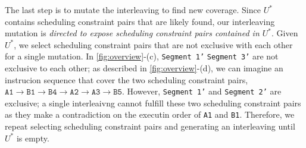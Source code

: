 The last step is to mutate the interleaving to find new
coverage. Since $U^*$ contains scheduling constraint pairs that are
likely found, our interleaving mutation is \textit{directed to expose
  scheduling constraint pairs contained in $U^*$}.
%
Given $U^*$, we select scheduling constraint pairs that are not
exclusive with each other for a single mutation.
%
In \autoref{fig:overview}-(c), \texttt{Segment 1'} \texttt{Segment 3'}
are not exclusive to each other; as described in
\autoref{fig:overview}-(d), we can imagine an instrucion sequence that
cover the two scheduling constraint pairs,
$\texttt{A1} \rightarrow \texttt{B1} \rightarrow \texttt{B4}
\rightarrow \texttt{A2} \rightarrow \texttt{A3} \rightarrow
\texttt{B5}$.
%
However, \texttt{Segment 1'} and \texttt{Segment 2'} are exclusive; a
single interleaivng cannot fulfill these two scheduling constraint
pairs as they make a contradiction on the executin order of
\texttt{A1} and \texttt{B1}.
%
Therefore, we repeat selecting scheduling constraint pairs and
generating an interleaving until $U^*$ is empty.
















